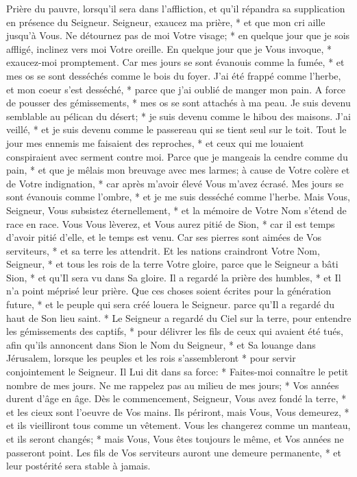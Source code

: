 Prière du pauvre, lorsqu'il sera dans l'affliction, et qu'il répandra sa supplication en présence du Seigneur.
Seigneur, exaucez ma prière, * et que mon cri aille jusqu'à Vous.
Ne détournez pas de moi Votre visage; * en quelque jour que je sois affligé, inclinez vers moi Votre oreille. En quelque jour que je Vous invoque, * exaucez-moi promptement.
Car mes jours se sont évanouis comme la fumée, * et mes os se sont desséchés comme le bois du foyer.
J'ai été frappé comme l'herbe, et mon coeur s'est desséché, * parce que j'ai oublié de manger mon pain.
A force de pousser des gémissements, * mes os se sont attachés à ma peau.
Je suis devenu semblable au pélican du désert; * je suis devenu comme le hibou des maisons.
J'ai veillé, * et je suis devenu comme le passereau qui se tient seul sur le toit.
Tout le jour mes ennemis me faisaient des reproches, * et ceux qui me louaient conspiraient avec serment contre moi.
Parce que je mangeais la cendre comme du pain, * et que je mêlais mon breuvage avec mes larmes;
à cause de Votre colère et de Votre indignation, * car après m'avoir élevé Vous m'avez écrasé.
Mes jours se sont évanouis comme l'ombre, * et je me suis desséché comme l'herbe.
Mais Vous, Seigneur, Vous subsistez éternellement, * et la mémoire de Votre Nom s'étend de race en race.
Vous Vous lèverez, et Vous aurez pitié de Sion, * car il est temps d'avoir pitié d'elle, et le temps est venu.
Car ses pierres sont aimées de Vos serviteurs, * et sa terre les attendrit.
Et les nations craindront Votre Nom, Seigneur, * et tous les rois de la terre Votre gloire,
parce que le Seigneur a bâti Sion, * et qu'Il sera vu dans Sa gloire.
Il a regardé la prière des humbles, * et Il n'a point méprisé leur prière.
Que ces choses soient écrites pour la génération future, * et le peuple qui sera créé louera le Seigneur.
parce qu'Il a regardé du haut de Son lieu saint. * Le Seigneur a regardé du Ciel sur la terre,
pour entendre les gémissements des captifs, * pour délivrer les fils de ceux qui avaient été tués,
afin qu'ils annoncent dans Sion le Nom du Seigneur, * et Sa louange dans Jérusalem,
lorsque les peuples et les rois s'assembleront * pour servir conjointement le Seigneur.
Il Lui dit dans sa force: * Faites-moi connaître le petit nombre de mes jours.
Ne me rappelez pas au milieu de mes jours; * Vos années durent d'âge en âge.
Dès le commencement, Seigneur, Vous avez fondé la terre, * et les cieux sont l'oeuvre de Vos mains.
Ils périront, mais Vous, Vous demeurez, * et ils vieilliront tous comme un vêtement. Vous les changerez comme un manteau, et ils seront changés; *
mais Vous, Vous êtes toujours le même, et Vos années ne passeront point.
Les fils de Vos serviteurs auront une demeure permanente, * et leur postérité sera stable à jamais.

